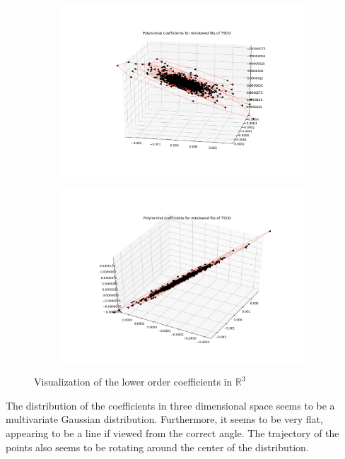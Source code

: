 \documentclass[final]{article}
\begin{document}
\begin{figure}[H]
  \centering
  \begin{subfigure}{.45\textwidth}
    \centering
    \includegraphics[width=\linewidth]{img/coeff1}
  \end{subfigure}
  \begin{subfigure}{.45\textwidth}
    \centering
    \includegraphics[width=\linewidth]{img/coeff2}
  \end{subfigure}
  \caption{Visualization of the lower order coefficients in $\mathbb{R}^3$}
  \label{fig:coeff}
\end{figure}

The distribution of the coefficients in three dimensional space seems to be a
multivariate Gaussian distribution. Furthermore, it seems to be very flat,
appearing to be a line if viewed from the correct angle. The trajectory of the
points also seems to be rotating around the center of the distribution.
\end{document}
